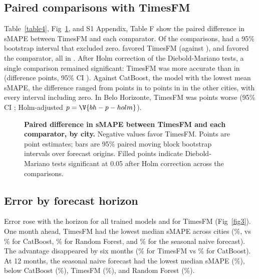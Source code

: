\documentclass[10pt,letterpaper]{article}
\begin{document}


\subsection*{Paired comparisons with TimesFM}
Table~\ref{table4}, Fig~\ref{fig2}, and S1 Appendix, Table F show the paired difference in sMAPE between TimesFM and each comparator. Of the  comparisons,  had a 95\% bootstrap interval that excluded zero.  favored TimesFM (against ), and  favored the comparator, all in . After Holm correction of the Diebold-Mariano tests, a single comparison remained significant: TimesFM was more accurate than  in  (difference  points, 95\% CI ). Against CatBoost, the model with the lowest mean sMAPE, the difference ranged from  points in  to  points in  in the other  cities, with every interval including zero. In Belo Horizonte, TimesFM was  points worse (95\% CI ; Holm-adjusted $p = \V{bh-p-holm}$).



\begin{figure}[!h]
\caption{\textbf{Paired difference in sMAPE between TimesFM and each comparator, by city.}
Negative values favor TimesFM. Points are point estimates; bars are 95\% paired moving block bootstrap intervals over forecast origins. Filled points indicate Diebold-Mariano tests significant at 0.05 after Holm correction across the  comparisons.}
\label{fig2}
\end{figure}

\subsection*{Error by forecast horizon}
Error rose with the horizon for all trained models and for TimesFM (Fig~\ref{fig3}). One month ahead, TimesFM had the lowest median sMAPE across cities (\%, vs \% for CatBoost, \% for Random Forest, and \% for the seasonal naive forecast). The advantage disappeared by six months (\% for TimesFM vs \% for CatBoost). At 12 months, the seasonal naive forecast had the lowest median sMAPE (\%), below CatBoost (\%), TimesFM (\%), and Random Forest (\%).
\end{document}
